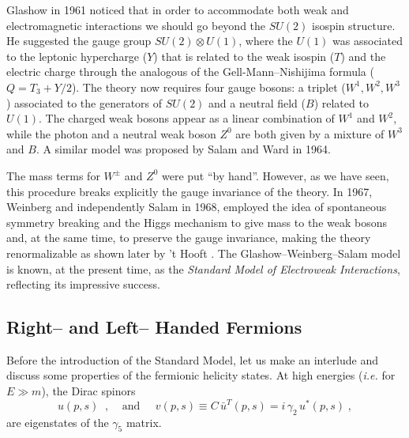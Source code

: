 \documentclass[12pt]{report}
\newcommand{\gc}{\gamma_5}
\begin{document}
Glashow \cite{Glashow:61} in 1961 noticed that in order to
accommodate both weak and electromagnetic interactions we should go
beyond the $SU(2)$ isospin structure. He suggested the gauge group
$SU(2) \otimes U(1)$, where the $U(1)$ was associated to the leptonic
hypercharge ($Y$) that is related to the weak isospin ($T$) and the
electric charge through the analogous of the Gell-Mann--Nishijima
formula ($Q = T_3 + Y/2$). The theory now requires four gauge bosons:
a triplet ($W^1, W^2, W^3$) associated to the generators of $SU(2)$
and a neutral field ($B$) related to $U(1)$. The charged weak bosons
appear as a linear combination of $W^1$ and $W^2$, while the photon
and a neutral weak boson $Z^0$ are both given by a mixture of $W^3$
and $B$. A similar model was proposed by Salam and Ward
\cite{Salam:64} in 1964. 

The mass terms for $W^\pm$ and $Z^0$ were put ``by hand''. However,
as we have seen, this procedure breaks explicitly the gauge
invariance of the theory. In 1967, Weinberg \cite{Weinberg:67} and
independently Salam \cite{Salam:68} in 1968, employed the idea of
spontaneous symmetry breaking and the Higgs mechanism to give mass to
the weak bosons and, at the same time, to preserve the gauge
invariance,  making the theory renormalizable as shown later by 't
Hooft \cite{Hooft:71}. The Glashow--Weinberg--Salam model is known,
at the present time, as the {\it Standard Model of Electroweak
Interactions}, reflecting its impressive success.  


\subsection{Right-- and Left-- Handed Fermions} \indent

Before the introduction of the Standard Model, let us make an interlude
and discuss some properties of the fermionic helicity states. At high
energies ({\it i.e.} for $E \gg m$), the Dirac spinors 
\[ 
u(p,s) \;\; , \;\;\;\; \mbox{and} \;\;\;\;\; 
v(p,s) \equiv C \, \bar{u}^T (p,s) = i
\, \gamma_2 \,  u^\ast(p,s) \; ,
\]
are eigenstates of the $\gc$ matrix. 
\end{document}

